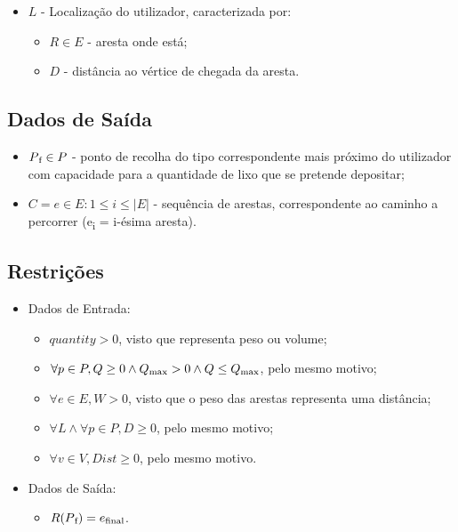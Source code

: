 \documentclass[article, a4paper, 12pt, oneside]{memoir}
\begin{document}
\begin{itemize}
\begin{itemize}
	\end{itemize} %

\item $L$ - Localização do utilizador, caracterizada por:
	
	\begin{itemize}
	
	\item $R \in E$ - aresta onde está;
	\item $D$ - distância ao vértice de chegada da aresta.
	
	\end{itemize}

\end{itemize} %

\subsection{Dados de Saída}

\begin{itemize}
\item $P\textsubscript{f} \in P$ - ponto de recolha do tipo correspondente mais próximo do utilizador com capacidade para a quantidade de lixo que se pretende depositar;
\item $C = {e \in E: 1 \leq i \leq |E|}$ - sequência de arestas, correspondente ao caminho a percorrer (e\textsubscript{i} = i-ésima aresta).
\end{itemize}


\subsection{Restrições}

\begin{itemize}

\item Dados de Entrada:

	\begin{itemize}
	\item $quantity > 0$, visto que representa peso ou volume;
	\item $\forall  p \in P, Q \geq 0 \land Q\textsubscript{max} > 0 \land Q \leq Q\textsubscript{max}$, pelo mesmo motivo;
	\item $\forall  e \in E, W > 0$, visto que o peso das arestas representa uma distância;
	\item $\forall L \land \forall p \in P, D \geq 0$, pelo mesmo motivo;
	\item $\forall v \in V, Dist \geq 0$, pelo mesmo motivo.
	\end{itemize}
	
\item Dados de Saída:

	\begin{itemize}
	\item $R(P\textsubscript{f}) = e\textsubscript{final}$.
	\end{itemize}
	
\end{itemize}
\end{document}
